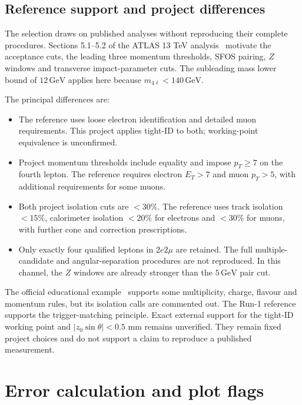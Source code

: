 \documentclass[11pt,a4paper]{article}
\newcommand{\gev}{\,\mathrm{GeV}}
\begin{document}
\subsection{Reference support and project differences}
The selection draws on published analyses without reproducing their complete procedures.
Sections 5.1--5.2 of the ATLAS 13 TeV analysis~\cite{ATLAS13} motivate the acceptance cuts, the leading three momentum thresholds, SFOS pairing, $Z$ windows and transverse impact-parameter cuts.
The subleading mass lower bound of $12\gev$ applies here because $m_{4\ell}<140\gev$.

The principal differences are:
\begin{itemize}[itemsep=1pt,topsep=2pt]
\item The reference uses loose electron identification and detailed muon requirements. This project applies tight-ID to both; working-point equivalence is unconfirmed.
\item Project momentum thresholds include equality and impose $p_T\geq7$ on the fourth lepton. The reference requires electron $E_T>7$ and muon $p_T>5$, with additional requirements for some muons.
\item Both project isolation cuts are $<30\%$. The reference uses track isolation $<15\%$, calorimeter isolation $<20\%$ for electrons and $<30\%$ for muons, with further cone and correction prescriptions.
\item Only exactly four qualified leptons in $2e2\mu$ are retained. The full multiple-candidate and angular-separation procedures are not reproduced. In this channel, the $Z$ windows are already stronger than the $5\gev$ pair cut.
\end{itemize}
The official educational example~\cite{HZZCuts,HZZAnalysis} supports some multiplicity, charge, flavour and momentum rules, but its isolation calls are commented out.
The Run-1 reference~\cite{ATLASRun1} supports the trigger-matching principle.
Exact external support for the tight-ID working point and $|z_0\sin\theta|<0.5$ mm remains unverified.
They remain fixed project choices and do not support a claim to reproduce a published measurement.
\FloatBarrier

\section{Error calculation and plot flags}\label{app:errors}
\end{document}
